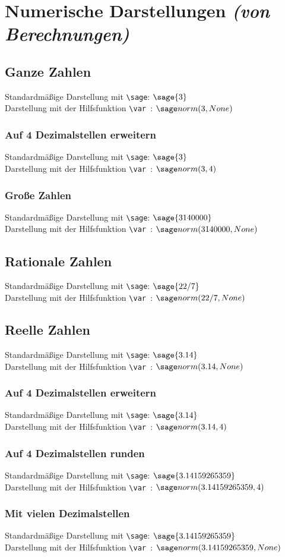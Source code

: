 \newcommand{\compare}[2][None]{
    \begin{flushleft}
        Standardmäßige Darstellung mit \texttt{{\textbackslash}sage}: \quad $\sage{#2}$\\
        Darstellung mit der Hilfsfunktion \texttt{{\textbackslash}var }: \quad $\var{#2, #1}$
    \end{flushleft}
} 

\section{Numerische Darstellungen \textit{(von Berechnungen)}}

\subsection{Ganze Zahlen}
\compare{3}

\subsubsection{Auf 4 Dezimalstellen erweitern}
\compare[4]{3}

\subsubsection{Große Zahlen}
\compare{3140000}

\subsection{Rationale Zahlen}
\compare{22/7}

\subsection{Reelle Zahlen}
\compare{3.14}

\subsubsection{Auf 4 Dezimalstellen erweitern}
\compare[4]{3.14}

\subsubsection{Auf 4 Dezimalstellen runden}
\compare[4]{3.14159265359}

\subsubsection{Mit vielen Dezimalstellen}
\compare{3.14159265359}

